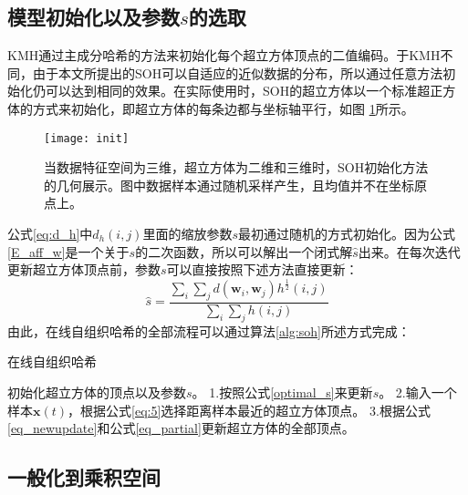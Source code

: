 \subsection{模型初始化以及参数$s$的选取}
KMH通过主成分哈希的方法来初始化每个超立方体顶点的二值编码。于KMH不同，由于本文所提出的SOH可以自适应的近似数据的分布，所以通过任意方法初始化仍可以达到相同的效果。在实际使用时，SOH的超立方体以一个标准超正方体的方式来初始化，即超立方体的每条边都与坐标轴平行，如图 \ref{init}所示。
\begin{figure}[ht]
	\begin{center}
		\texttt{[image: init]}
		\caption{当数据特征空间为三维，超立方体为二维和三维时，SOH初始化方法的几何展示。图中数据样本通过随机采样产生，且均值并不在坐标原点上。}
		\label{init}
	\end{center}
\end{figure}

公式\ref{eq:d_h}中$d_{h}(i, j)$里面的缩放参数$s$最初通过随机的方式初始化。因为公式\ref{E_aff_w}是一个关于$s$的二次函数，所以可以解出一个闭式解$\hat{s}$出来。在每次迭代更新超立方体顶点前，参数$s$可以直接按照下述方法直接更新：
\begin{equation}\label{optimal_s}
\hat{s} = \frac{\sum_{i}\sum_{j}d(\mathbf{w}_{i}, \mathbf{w}_{j})h^{\frac{1}{2}}(i,j)}{\sum_{i}\sum_{j}h(i,j)}
\end{equation}
由此，在线自组织哈希的全部流程可以通过算法\ref{alg:soh}所述方式完成：
\begin{algorithm}[tb]
	\caption{在线自组织哈希}
	\label{alg:soh}
	\begin{algorithmic}
		\State 初始化超立方体的顶点以及参数$s$。
		\State 1.按照公式\ref{optimal_s}来更新$s$。
		\State 2.输入一个样本$\mathbf{x}(t)$，根据公式\ref{eq:5}选择距离样本最近的超立方体顶点。
		\State 3.根据公式\ref{eq_newupdate}和公式\ref{eq_partial}更新超立方体的全部顶点。
		\EndFor
	\end{algorithmic}
\end{algorithm}

\subsection{一般化到乘积空间}

